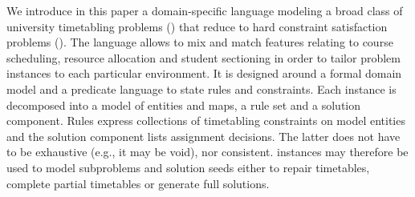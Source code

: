 We introduce in this paper a domain-specific language modeling a broad class of university timetabling problems ({\UTP}) that reduce to hard constraint satisfaction problems ({\CSP}). 
The {\UTP} language allows to mix and match features relating to course scheduling, resource allocation and student sectioning in order to tailor problem instances to each particular environment.
It is designed around a formal domain model and a predicate language to state rules and constraints. 
Each instance is decomposed into a model of entities and maps, a rule set and a solution component. 
Rules express collections of timetabling constraints %
on model entities and 
the solution component %
lists assignment decisions. 
The latter does not have to be exhaustive (e.g., it may be void), nor consistent. 
{\UTP} instances may therefore be used to model subproblems and solution seeds %
either to repair timetables, complete partial timetables or generate full solutions. 

